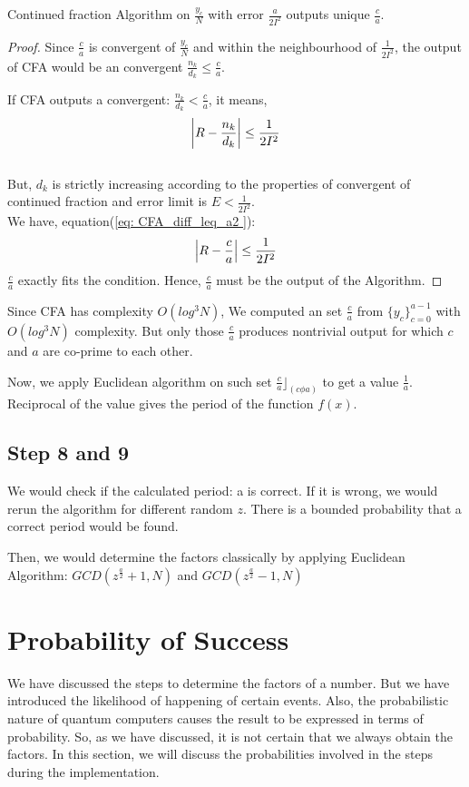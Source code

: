 \begin{conj}
    Continued fraction Algorithm on $\frac{y_c}{N}$ with error $\frac{a}{2I^2}$ outputs unique $\frac{c}{a}$.
\end{conj}
\begin{proof}
    Since $\frac{c}{a}$ is convergent of $\frac{y_c}{N}$ and within the neighbourhood of $\frac{1}{2I^2}$, the output of CFA would be an convergent $\frac{n_k}{d_k} \leq \frac{c}{a}$.
    
    If CFA outputs a convergent: $\frac{n_k}{d_k} <\frac{c}{a}$, it means,
    \begin{equation*}
        \abs{R -\frac{n_k}{d_k}} \leq \frac{1}{2I^2}
    \end{equation*}
    \\But, $d_k$ is strictly increasing according to the properties of convergent of continued fraction and error limit is $E<\frac{1}{2I^2}$.
    \\We have, equation(\ref{eq: CFA_diff_leq_a2 }): \begin{equation*}
        \abs{R -\frac{c}{a}} \leq \frac{1}{2I^2}
    \end{equation*}
    $\frac{c}{a}$ exactly fits the condition. Hence, $\frac{c}{a}$ must be the output of the Algorithm. 
\end{proof}
Since CFA has complexity $O(log^3N)$, We computed an set $\frac{c}{a}$ from $\{y_c\}_{c=0}^{a-1}$ with $O(log^3N)$ complexity. But only those $\frac{c}{a}$ produces nontrivial output for which $c$ and $a$ are co-prime to each other.

Now, we apply Euclidean algorithm on such set $\frac{c}{a}\rfloor_{(c \phi a)}$ to get a value $\frac{1}{a}$. Reciprocal of the value gives the period of the function $f(x)$.

\subsection{Step 8 and 9}
We would check if the calculated period: a is correct. If it is wrong, we would rerun the algorithm for different random $z$. There is a bounded probability that a correct period would be found.

Then, we  would determine the factors classically by applying Euclidean Algorithm: $GCD(z^\frac{a}{2} + 1, N)$ and $GCD(z^\frac{a}{2} - 1, N)$

\section{Probability of Success} \label{probab of success}
We have discussed the steps to determine the factors of a number. But we have introduced the likelihood of happening of certain events. Also, the probabilistic nature of quantum computers causes the result to be expressed in terms of probability. So, as we have discussed, it is not certain that we always obtain the factors. In this section, we will discuss the probabilities involved in the steps during the implementation.

